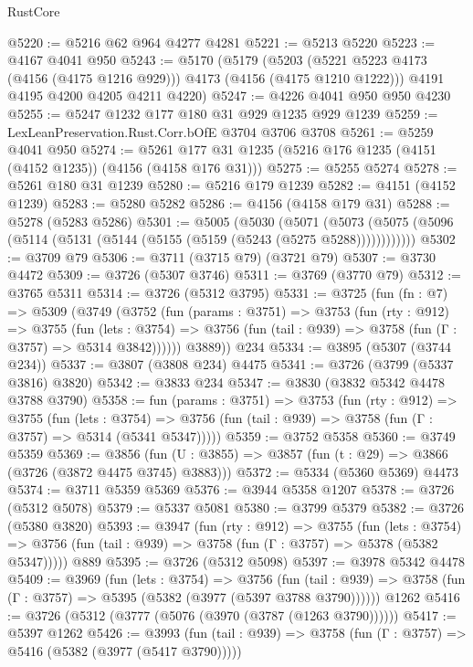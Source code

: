 \begin{lexlean}{RustCore}
\begin{coremodule}
@5220 := @5216 @62 @964 @4277 @4281
@5221 := @5213 @5220
@5223 := @4167 @4041 @950
@5243 := @5170
    (@5179
      (@5203 (@5221 @5223 @4173 (@4156 (@4175 @1216 @929))) @4173 (@4156 (@4175 @1210 @1222)))
      @4191
      @4195
      @4200
      @4205
      @4211
      @4220)
@5247 := @4226 @4041 @950 @950 @4230
@5255 := @5247 @1232 @177 @180 @31 @929 @1235 @929 @1239
@5259 := LexLeanPreservation.Rust.Corr.bOfE @3704 @3706 @3708
@5261 := @5259 @4041 @950
@5274 := @5261 @177 @31 @1235 (@5216 @176 @1235 (@4151 (@4152 @1235)) (@4156 (@4158 @176 @31)))
@5275 := @5255 @5274
@5278 := @5261 @180 @31 @1239
@5280 := @5216 @179 @1239
@5282 := @4151 (@4152 @1239)
@5283 := @5280 @5282
@5286 := @4156 (@4158 @179 @31)
@5288 := @5278 (@5283 @5286)
@5301 := @5005
    (@5030
      (@5071 (@5073 (@5075 (@5096 (@5114 (@5131 (@5144 (@5155 (@5159 (@5243 (@5275 @5288))))))))))))
@5302 := @3709 @79
@5306 := @3711 (@3715 @79) (@3721 @79)
@5307 := @3730 @4472
@5309 := @3726 (@5307 @3746)
@5311 := @3769 (@3770 @79)
@5312 := @3765 @5311
@5314 := @3726 (@5312 @3795)
@5331 := @3725
    (fun (fn : @7) =>
    @5309
      (@3749
        (@3752
          (fun (params : @3751) =>
          @3753
            (fun (rty : @912) =>
            @3755
              (fun (lets : @3754) =>
              @3756 (fun (tail : @939) => @3758 (fun (Γ : @3757) => @5314 @3842))))))
        @3889))
    @234
@5334 := @3895 (@5307 (@3744 @234))
@5337 := @3807 (@3808 @234) @4475
@5341 := @3726 (@3799 (@5337 @3816) @3820)
@5342 := @3833 @234
@5347 := @3830 (@3832 @5342 @4478 @3788 @3790)
@5358 := fun (params : @3751) =>
  @3753
    (fun (rty : @912) =>
    @3755
      (fun (lets : @3754) =>
      @3756 (fun (tail : @939) => @3758 (fun (Γ : @3757) => @5314 (@5341 @5347)))))
@5359 := @3752 @5358
@5360 := @3749 @5359
@5369 := @3856 (fun (U : @3855) => @3857 (fun (t : @29) => @3866 (@3726 (@3872 @4475 @3745) @3883)))
@5372 := @5334 (@5360 @5369) @4473
@5374 := @3711 @5359 @5369
@5376 := @3944 @5358 @1207
@5378 := @3726 (@5312 @5078)
@5379 := @5337 @5081
@5380 := @3799 @5379
@5382 := @3726 (@5380 @3820)
@5393 := @3947
    (fun (rty : @912) =>
    @3755
      (fun (lets : @3754) =>
      @3756 (fun (tail : @939) => @3758 (fun (Γ : @3757) => @5378 (@5382 @5347)))))
    @889
@5395 := @3726 (@5312 @5098)
@5397 := @3978 @5342 @4478
@5409 := @3969
    (fun (lets : @3754) =>
    @3756
      (fun (tail : @939) => @3758 (fun (Γ : @3757) => @5395 (@5382 (@3977 (@5397 @3788 @3790))))))
    @1262
@5416 := @3726 (@5312 (@3777 (@5076 (@3970 (@3787 (@1263 @3790))))))
@5417 := @5397 @1262
@5426 := @3993
    (fun (tail : @939) => @3758 (fun (Γ : @3757) => @5416 (@5382 (@3977 (@5417 @3790)))))

\end{coremodule}
\end{lexlean}
